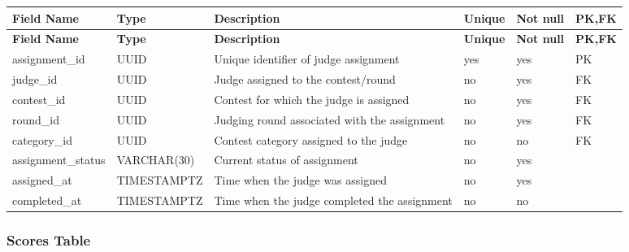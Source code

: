 \vspace{0.5em}
\renewcommand{\arraystretch}{1.15}
\setlength{\tabcolsep}{4pt}
\small
\begin{longtable}{|>{\raggedright\arraybackslash}p{}|>{\raggedright\arraybackslash}p{}|>{\raggedright\arraybackslash}p{}|>{\centering\arraybackslash}p{}|>{\centering\arraybackslash}p{}|>{\centering\arraybackslash}p{}|}
\hline
\textbf{Field Name} & \textbf{Type} & \textbf{Description} & \textbf{Unique} & \textbf{Not null} & \textbf{PK,FK} \\
\hline
\endfirsthead
\textbf{Field Name} & \textbf{Type} & \textbf{Description} & \textbf{Unique} & \textbf{Not null} & \textbf{PK,FK} \\
\hline
\endhead
assignment\_id & UUID & Unique identifier of judge assignment & yes & yes & PK \\
\hline
judge\_id & UUID & Judge assigned to the contest/round & no & yes & FK \\
\hline
contest\_id & UUID & Contest for which the judge is assigned & no & yes & FK \\
\hline
round\_id & UUID & Judging round associated with the assignment & no & yes & FK \\
\hline
category\_id & UUID & Contest category assigned to the judge & no & no & FK \\
\hline
assignment\_status & VARCHAR(30) & Current status of assignment & no & yes & \\
\hline
assigned\_at & TIMESTAMPTZ & Time when the judge was assigned & no & yes & \\
\hline
completed\_at & TIMESTAMPTZ & Time when the judge completed the assignment & no & no & \\
\hline
\end{longtable}

\vspace{1em}
\subsubsection{Scores Table}
\label{subsubsec:scores-table}

